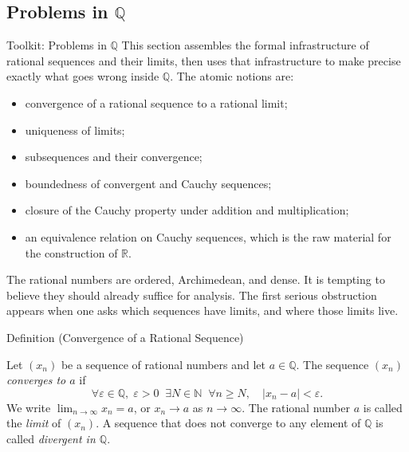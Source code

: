 
\subsection*{Problems in $\mathbb{Q}$}
\label{sec:problems-in-q}

\begin{toolkitbox}{Toolkit: Problems in $\mathbb{Q}$}
This section assembles the formal infrastructure of rational sequences and
their limits, then uses that infrastructure to make precise exactly what goes
wrong inside $\mathbb{Q}$. The atomic notions are:
\begin{itemize}
  \item convergence of a rational sequence to a rational limit;
  \item uniqueness of limits;
  \item subsequences and their convergence;
  \item boundedness of convergent and Cauchy sequences;
  \item closure of the Cauchy property under addition and multiplication;
  \item an equivalence relation on Cauchy sequences, which is the
        raw material for the construction of $\mathbb{R}$.
\end{itemize}
\end{toolkitbox}

\begin{remark*}
The rational numbers are ordered, Archimedean, and dense. It is tempting
to believe they should already suffice for analysis. The first serious
obstruction appears when one asks which sequences have limits, and where
those limits live.
\end{remark*}

\begin{definitionbox}{Definition (Convergence of a Rational Sequence)}
\begin{definition}
\label{def:convergent-rational-sequence}
Let $(x_n)$ be a sequence of rational numbers and let $a \in \mathbb{Q}$.
The sequence $(x_n)$ \emph{converges to $a$} if
\[
\forall \varepsilon \in \mathbb{Q},\; \varepsilon > 0 \;\;
\exists N \in \mathbb{N} \;\;
\forall n \geq N, \quad |x_n - a| < \varepsilon.
\]
We write $\lim_{n \to \infty} x_n = a$, or $x_n \to a$ as $n \to \infty$.
The rational number $a$ is called the \emph{limit} of $(x_n)$.
A sequence that does not converge to any element of $\mathbb{Q}$ is
called \emph{divergent in $\mathbb{Q}$}.
\end{definition}
\end{definitionbox}

